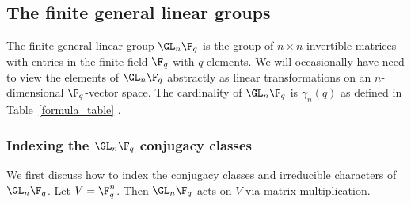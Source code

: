 









































\subsection{The finite general linear groups}

The finite general linear group \(\GL_n \F_q\) is the group of \(n \times n\) invertible matrices with entries in the finite field \(\F_q\) with \(q\) elements.
We will occasionally have need to view the elements of \(\GL_n \F_q\) abstractly as linear transformations on an \(n\)-dimensional \(\F_q\)-vector space.
The cardinality of \(\GL_n \F_q\) is \(\gamma_n(q)\) as defined in Table~\ref{formula_table} \cite[Proposition~1.10.1]{EC1}.

\subsubsection{Indexing the \(\GL_n \F_q\) conjugacy classes} \label{indexing}

We first discuss how to index the conjugacy classes and irreducible characters of $\GL_n \F_q$.
Let $V = \F_q^n$.
Then $\GL_n \F_q$ acts on $V$ via matrix multiplication.

